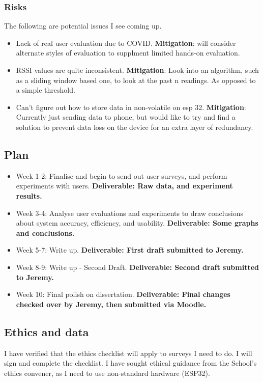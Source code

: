 \documentclass[11pt]{article}
\begin{document}
\subsubsection{Risks}\label{risks}

The following are potential issues I see coming up.

\begin{itemize}
    \setlength\itemsep{0.1em}
\item Lack of real user evaluation due to COVID. \textbf{Mitigation}: will consider 
alternate styles of evaluation to supplment limited hands-on evaluation.
\item RSSI values are quite inconsistent. \textbf{Mitigation}: Look into an 
algorithm, such as a sliding window based one, to look at the past n readings. As 
opposed to a simple threshold.
\item Can't figure out how to store data in non-volatile on esp 32. 
\textbf{Mitigation}: Currently just sending data to phone, but would like to try and 
find a solution to prevent data loss on the device for an extra layer of redundancy.

\end{itemize}

\subsection{Plan}\label{plan}

\begin{itemize}
    \setlength\itemsep{0.1em}
    \item
      Week 1-2: Finalise and begin to send out user surveys, and perform experiments 
      with users. \textbf{Deliverable: Raw data, and experiment results.}
    \item
      Week 3-4: Analyse user evaluations and experiments to draw conclusions about
      system accuracy, efficiency, and usability. \textbf{Deliverable: Some graphs 
      and conclusions.}
    \item
      Week 5-7: Write up. \textbf{Deliverable: First draft submitted to
      Jeremy.}
    \item
      Week 8-9: Write up - Second Draft. \textbf{Deliverable: Second draft submitted to
      Jeremy.}
    \item
      Week 10: Final polish on dissertation. \textbf{Deliverable: Final changes checked 
      over by Jeremy, then submitted via Moodle.}
    \end{itemize}

    
\subsection{Ethics and data}\label{ethics}

I have verified that the ethics checklist will apply to surveys I need to do. I will sign and complete the checklist.
I have sought ethical guidance from the School's ethics convener, as I need to use non-standard hardware (ESP32).
\end{document}
